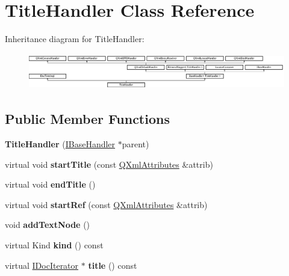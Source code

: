 \hypertarget{class_title_handler}{}\section{Title\+Handler Class Reference}
\label{class_title_handler}
Inheritance diagram for Title\+Handler\+:\begin{figure}[H]
\begin{center}
\leavevmode
\includegraphics[height=1.600000cm]{class_title_handler}
\end{center}
\end{figure}
\subsection*{Public Member Functions}
\begin{DoxyCompactItemize}
\item 
\mbox{\label{class_title_handler_ade8d9164f3dfd1b45bfab110928c0f8b}} 
{\bfseries Title\+Handler} (\mbox{\hyperlink{class_i_base_handler}{I\+Base\+Handler}} $\ast$parent)
\item 
\mbox{\label{class_title_handler_a4fc6869b55716807130b2774adb16a16}} 
virtual void {\bfseries start\+Title} (const \mbox{\hyperlink{class_q_xml_attributes}{Q\+Xml\+Attributes}} \&attrib)
\item 
\mbox{\label{class_title_handler_af501d456bfcf76499929160699337c47}} 
virtual void {\bfseries end\+Title} ()
\item 
\mbox{\label{class_title_handler_ae4b1ab2cf35da1c32757248c43418304}} 
virtual void {\bfseries start\+Ref} (const \mbox{\hyperlink{class_q_xml_attributes}{Q\+Xml\+Attributes}} \&attrib)
\item 
\mbox{\label{class_title_handler_a371f5233dc3d9db0fc5634d69e805a8a}} 
void {\bfseries add\+Text\+Node} ()
\item 
\mbox{\label{class_title_handler_af8bb2094644615d40221a4c599d45259}} 
virtual Kind {\bfseries kind} () const
\item 
\mbox{\label{class_title_handler_a4a2e385b69f0e32896c4fd53d777d288}} 
virtual \mbox{\hyperlink{class_i_doc_iterator}{I\+Doc\+Iterator}} $\ast$ {\bfseries title} () const
\end{DoxyCompactItemize}
